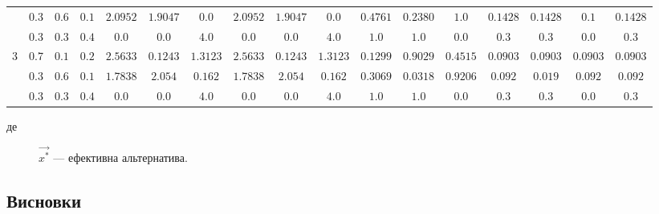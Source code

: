 \begin{landscape}
\begin{table}[H]
\begin{tabular}{c|c c c|c c c|c c c|c c c|c c c|c}
            & $0.3$ & $0.6$ & $0.1$ 
            & $2.0952$ & $1.9047$ & $0.0$
            & $2.0952$ & $1.9047$ & $0.0$
            & $0.4761$ & $0.2380$ & $1.0$
            & $0.1428$ & $0.1428$ & $0.1$
            & $0.1428$ \\

            & $0.3$ & $0.3$ & $0.4$ 
            & $0.0$ & $0.0$ & $4.0$
            & $0.0$ & $0.0$ & $4.0$
            & $1.0$ & $1.0$ & $0.0$
            & $0.3$ & $0.3$ & $0.0$
            & $0.3$ \\
            \hline

            \multirow{3}{*}{3}
            & $0.7$ & $0.1$ & $0.2$	
            & $2.5633$ & $0.1243$ & $1.3123$
            & $2.5633$ & $0.1243$ & $1.3123$
            & $0.1299$ & $0.9029$ & $0.4515$
            & $0.0903$ & $0.0903$ & $0.0903$
            & $0.0903$ \\

            & $0.3$ & $0.6$ & $0.1$	
            & $1.7838$ & $2.054$ & $0.162$
            & $1.7838$ & $2.054$ & $0.162$
            & $0.3069$ & $0.0318$ & $0.9206$
            & $0.092$ & $0.019$ & $0.092$
            & $0.092$ \\

            & $0.3$ & $0.3$ & $0.4$ 
            & $0.0$ & $0.0$ & $4.0$
            & $0.0$ & $0.0$ & $4.0$
            & $1.0$ & $1.0$ & $0.0$
            & $0.3$ & $0.3$ & $0.0$
            & $0.3$ \\
        \end{tabular}
        \end{table}
        \begin{description}
        	\item[де] $\vec{x^*}$ --- ефективна альтернатива.
        \end{description}
    \end{landscape}

\subsection{Висновки}

